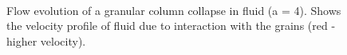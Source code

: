 \begin{figure}
\ContinuedFloat
{}\\
\caption{Flow evolution of a granular column collapse in fluid (a = 4). Shows 
the velocity profile of fluid due to interaction with the grains (red - higher 
velocity).}
\label{fig:a4_snapshots}
\end{figure}

